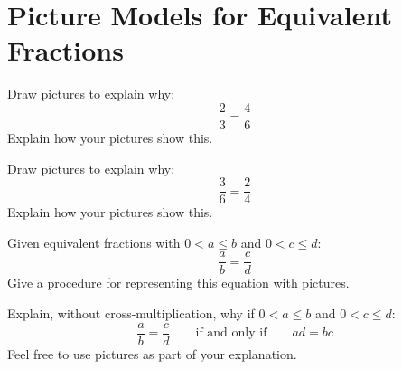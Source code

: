 \newpage
\section{Picture Models for Equivalent Fractions}\label{A:EF}


\begin{prob} 
Draw pictures to explain why:
\[
\frac{2}{3} = \frac{4}{6}
\]
Explain how your pictures show this.
\end{prob}


\begin{prob} 
Draw pictures to explain why:
\[
\frac{3}{6} = \frac{2}{4}
\]
Explain how your pictures show this.
\end{prob}



\begin{prob} 
Given equivalent fractions with $0< a\le b$ and $0 < c\le d$:
\[
\frac{a}{b} = \frac{c}{d}
\]
Give a procedure for representing this equation with pictures.
\end{prob}


\begin{prob} 
Explain, without cross-multiplication, why if $0< a\le b$ and $0 < c\le d$:
\[
\frac{a}{b} = \frac{c}{d}\qquad \text{if and only if}\qquad ad = bc
\]
Feel free to use pictures as part of your explanation.
\end{prob}
